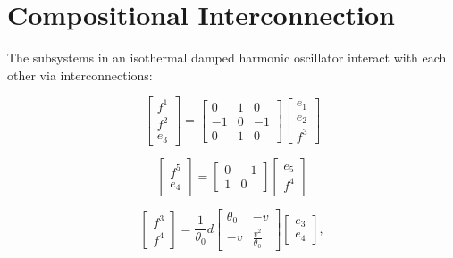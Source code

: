 \documentclass[
	parskip, 			   %
	twoside, 			   %
	DIV=14, 			   %
	BCOR=15.0mm, 		   %
	headsepline, 		   %
	open=right, 		   %
	captions=tableheading, %
	bibliography=totoc,    %
	numbers=noenddot       %
]{scrreprt}
\begin{document}
\section{Compositional Interconnection}

The subsystems in an isothermal damped harmonic oscillator interact with each other via interconnections:

\begin{equation}
    \label{eq:idho_interconnection1}
    \left[\begin{array}{c}
    f^1 \\
    f^2 \\
    \hline e_3
    \end{array}\right]=\left[\begin{array}{rr|r}
    0 & 1 & 0 \\
    -1 & 0 & -1 \\
    \hline 0 & 1 & 0
    \end{array}\right]\left[\begin{array}{c}
    e_1 \\
    e_2 \\
    \hline f^3
    \end{array}\right]
\end{equation}

\begin{equation}
    \label{eq:idho_interconnection2}
    \left[\begin{array}{c}
    f^5 \\
    \hline e_4
    \end{array}\right]=\left[\begin{array}{r|r}
    0 & -1 \\
    \hline 1 & 0
    \end{array}\right]\left[\begin{array}{c}
    e_5 \\
    \hline f^4
    \end{array}\right]
\end{equation}

\begin{equation}
    \label{eq:idho_interconnection3}
    \left[\begin{array}{l}
    f^3 \\
    f^4
    \end{array}\right]=\frac{1}{\theta_0} d\left[\begin{array}{rr}
    \theta_0 & -v \\
    -v & \frac{v^2}{\theta_0}
    \end{array}\right]\left[\begin{array}{l}
    e_3 \\
    e_4
    \end{array}\right],
\end{equation}
\end{document}
